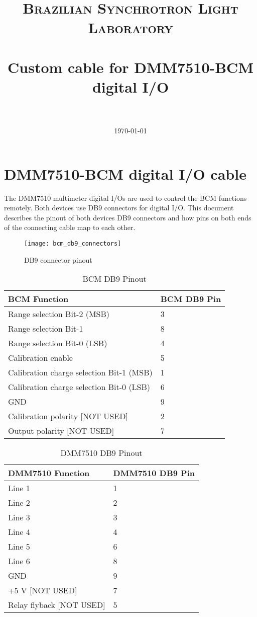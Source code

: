 \documentclass[paper=a4, fontsize=11pt]{scrartcl}
\title{
		\usefont{OT1}{bch}{b}{n}
		\normalfont \normalsize \textsc{Brazilian Synchrotron Light Laboratory} \\ [25pt]
		\horrule{0.5pt} \\[0.4cm]
		\huge Custom cable for DMM7510-BCM digital I/O \\
		\horrule{2pt} \\[0.5cm]
}
\author{
		\normalfont 								\normalsize
        \today
}
\date{}
\numberwithin{figure}{section}			%
\numberwithin{table}{section}			%
\begin{document}
\maketitle
\section{DMM7510-BCM digital I/O cable}
The DMM7510 multimeter digital I/Os are used to control the BCM functions remotely. Both devices use DB9 connectors for digital I/O. This document describes the pinout of both devices DB9 connectors and how pins on both ends of the connecting cable map to each other.

\begin{figure}[!h]
	\caption{DB9 connector pinout}
	\label{fig:db9-pins}
	\centering
	\texttt{[image: bcm\_db9\_connectors]}
\end{figure}
\FloatBarrier

\begin{table}
	\center
	\caption{BCM DB9 Pinout}
	\begin{tabular}{m{8cm} m{2cm}}
		\bfseries BCM Function & \bfseries BCM DB9 Pin \\ \hline
		Range selection Bit-2 (MSB) & 3 \\ \hline
		Range selection Bit-1 & 8 \\ \hline
		Range selection Bit-0 (LSB) & 4 \\ \hline
		Calibration enable & 5 \\ \hline
		Calibration charge selection Bit-1 (MSB) & 1 \\ \hline
		Calibration charge selection Bit-0 (LSB) & 6 \\ \hline
		GND & 9 \\ \hline
		Calibration polarity [NOT USED] & 2 \\ \hline
		Output polarity [NOT USED] & 7 \\ \hline
	\end{tabular}
\end{table}

\begin{table}
	\center
	\caption{DMM7510 DB9 Pinout}
	\begin{tabular}{m{8cm} m{2cm}}
		\bfseries DMM7510 Function & \bfseries DMM7510 DB9 Pin \\ \hline
		Line 1 & 1 \\ \hline
		Line 2 & 2 \\ \hline
		Line 3 & 3 \\ \hline
		Line 4 & 4 \\ \hline
		Line 5 & 6 \\ \hline
		Line 6 & 8 \\ \hline
		GND & 9 \\ \hline
		+5 V [NOT USED] & 7 \\ \hline
		Relay flyback [NOT USED] & 5 \\ \hline
	\end{tabular}
\end{table}
\end{document}
